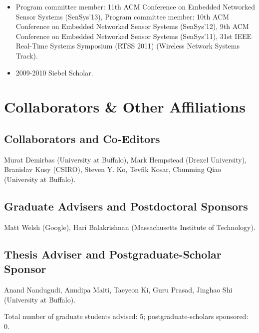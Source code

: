 \begin{itemize}

\item Program committee member: 11th ACM Conference on Embedded Networked
Sensor Systems (SenSys'13), Program committee member: 10th ACM Conference on
Embedded Networked Sensor Systems (SenSys'12), 9th ACM Conference on Embedded
Networked Sensor Systems (SenSys'11), 31st IEEE Real-Time Systems Symposium
(RTSS 2011) (Wireless Network Systems Track).

\item 2009-2010 Siebel Scholar.

\end{itemize}

\section{Collaborators \& Other Affiliations}

\subsection{Collaborators and Co-Editors}

Murat Demirbas (University at Buffalo), Mark Hempstead (Drexel University),
Branislav Kusy (CSIRO), Steven Y. Ko, Tevfik Kosar, Chunming Qiao (University
at Buffalo).

\subsection{Graduate Advisers and Postdoctoral Sponsors}

Matt Welsh (Google), Hari Balakrishnan (Massachusetts Institute of Technology).

\subsection{Thesis Adviser and Postgraduate-Scholar Sponsor}

Anand Nandugudi, Anudipa Maiti, Taeyeon Ki, Guru Prasad, Jinghao Shi
(University at Buffalo).

Total number of graduate students advised: 5; postgraduate-scholars
sponsored: 0.


